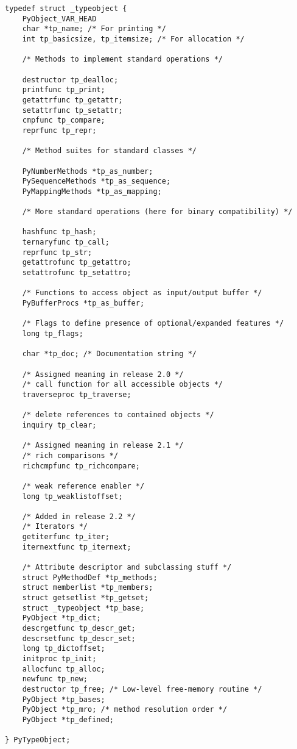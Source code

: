 \begin{verbatim}
typedef struct _typeobject {
    PyObject_VAR_HEAD
    char *tp_name; /* For printing */
    int tp_basicsize, tp_itemsize; /* For allocation */

    /* Methods to implement standard operations */

    destructor tp_dealloc;
    printfunc tp_print;
    getattrfunc tp_getattr;
    setattrfunc tp_setattr;
    cmpfunc tp_compare;
    reprfunc tp_repr;

    /* Method suites for standard classes */

    PyNumberMethods *tp_as_number;
    PySequenceMethods *tp_as_sequence;
    PyMappingMethods *tp_as_mapping;

    /* More standard operations (here for binary compatibility) */

    hashfunc tp_hash;
    ternaryfunc tp_call;
    reprfunc tp_str;
    getattrofunc tp_getattro;
    setattrofunc tp_setattro;

    /* Functions to access object as input/output buffer */
    PyBufferProcs *tp_as_buffer;

    /* Flags to define presence of optional/expanded features */
    long tp_flags;

    char *tp_doc; /* Documentation string */

    /* Assigned meaning in release 2.0 */
    /* call function for all accessible objects */
    traverseproc tp_traverse;

    /* delete references to contained objects */
    inquiry tp_clear;

    /* Assigned meaning in release 2.1 */
    /* rich comparisons */
    richcmpfunc tp_richcompare;

    /* weak reference enabler */
    long tp_weaklistoffset;

    /* Added in release 2.2 */
    /* Iterators */
    getiterfunc tp_iter;
    iternextfunc tp_iternext;

    /* Attribute descriptor and subclassing stuff */
    struct PyMethodDef *tp_methods;
    struct memberlist *tp_members;
    struct getsetlist *tp_getset;
    struct _typeobject *tp_base;
    PyObject *tp_dict;
    descrgetfunc tp_descr_get;
    descrsetfunc tp_descr_set;
    long tp_dictoffset;
    initproc tp_init;
    allocfunc tp_alloc;
    newfunc tp_new;
    destructor tp_free; /* Low-level free-memory routine */
    PyObject *tp_bases;
    PyObject *tp_mro; /* method resolution order */
    PyObject *tp_defined;

} PyTypeObject;
\end{verbatim}

